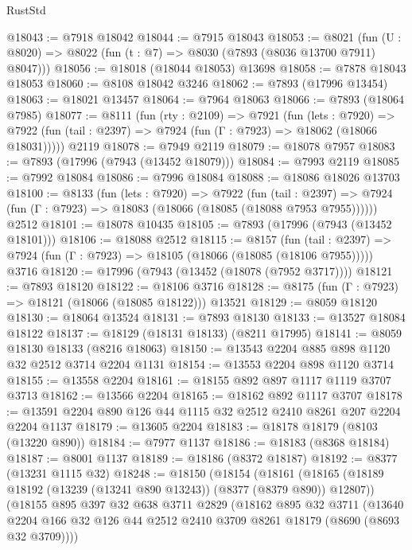 \begin{lexlean}{RustStd}
\begin{coremodule}
@18043 := @7918 @18042
@18044 := @7915 @18043
@18053 := @8021
    (fun (U : @8020) => @8022 (fun (t : @7) => @8030 (@7893 (@8036 @13700 @7911) @8047)))
@18056 := @18018 (@18044 @18053) @13698
@18058 := @7878 @18043 @18053
@18060 := @8108 @18042 @3246
@18062 := @7893 (@17996 @13454)
@18063 := @18021 @13457
@18064 := @7964 @18063
@18066 := @7893 (@18064 @7985)
@18077 := @8111
    (fun (rty : @2109) =>
    @7921
      (fun (lets : @7920) =>
      @7922 (fun (tail : @2397) => @7924 (fun (Γ : @7923) => @18062 (@18066 @18031)))))
    @2119
@18078 := @7949 @2119
@18079 := @18078 @7957
@18083 := @7893 (@17996 (@7943 (@13452 @18079)))
@18084 := @7993 @2119
@18085 := @7992 @18084
@18086 := @7996 @18084
@18088 := @18086 @18026 @13703
@18100 := @8133
    (fun (lets : @7920) =>
    @7922
      (fun (tail : @2397) =>
      @7924 (fun (Γ : @7923) => @18083 (@18066 (@18085 (@18088 @7953 @7955))))))
    @2512
@18101 := @18078 @10435
@18105 := @7893 (@17996 (@7943 (@13452 @18101)))
@18106 := @18088 @2512
@18115 := @8157
    (fun (tail : @2397) => @7924 (fun (Γ : @7923) => @18105 (@18066 (@18085 (@18106 @7955)))))
    @3716
@18120 := @17996 (@7943 (@13452 (@18078 (@7952 @3717))))
@18121 := @7893 @18120
@18122 := @18106 @3716
@18128 := @8175 (fun (Γ : @7923) => @18121 (@18066 (@18085 @18122))) @13521
@18129 := @8059 @18120
@18130 := @18064 @13524
@18131 := @7893 @18130
@18133 := @13527 @18084 @18122
@18137 := @18129 (@18131 @18133) (@8211 @17995)
@18141 := @8059 @18130 @18133 (@8216 @18063)
@18150 := @13543 @2204 @885 @898 @1120 @32 @2512 @3714 @2204 @1131
@18154 := @13553 @2204 @898 @1120 @3714
@18155 := @13558 @2204
@18161 := @18155 @892 @897 @1117 @1119 @3707 @3713
@18162 := @13566 @2204
@18165 := @18162 @892 @1117 @3707
@18178 := @13591 @2204 @890 @126 @44 @1115 @32 @2512 @2410 @8261 @207 @2204 @2204 @1137
@18179 := @13605 @2204
@18183 := @18178 @18179 (@8103 (@13220 @890))
@18184 := @7977 @1137
@18186 := @18183 (@8368 @18184)
@18187 := @8001 @1137
@18189 := @18186 (@8372 @18187)
@18192 := @8377 (@13231 @1115 @32)
@18248 := @18150
    (@18154
      (@18161
        (@18165 (@18189 @18192 (@13239 (@13241 @890 @13243)) (@8377 (@8379 @890)) @12807))
        (@18155
          @895
          @397
          @32
          @638
          @3711
          @2829
          (@18162
            @895
            @32
            @3711
            (@13640
              @2204
              @166
              @32
              @126
              @44
              @2512
              @2410
              @3709
              @8261
              @18179
              (@8690 (@8693 @32 @3709))))

\end{coremodule}
\end{lexlean}
